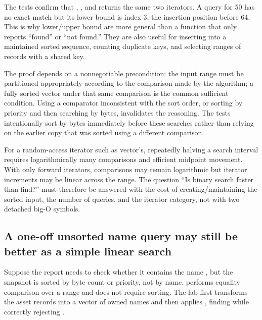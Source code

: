 The tests confirm that , , and  returns the same two iterators. A query for 50 has no exact match but its lower bound is index 3, the insertion position before 64. This is why lower/upper bound are more general than a function that only reports ``found'' or ``not found.'' They are also useful for inserting into a maintained sorted sequence, counting duplicate keys, and selecting ranges of records with a shared key.

The proof depends on a nonnegotiable precondition: the input range must be partitioned appropriately according to the comparison made by the algorithm; a fully sorted vector under that same comparison is the common sufficient condition. Using a comparator inconsistent with the sort order, or sorting by priority and then searching by bytes, invalidates the reasoning. The tests intentionally sort by bytes immediately before these searches rather than relying on the earlier copy that was sorted using a different comparison.

For a random-access iterator such as vector's, repeatedly halving a search interval requires logarithmically many comparisons and efficient midpoint movement. With only forward iterators, comparisons may remain logarithmic but iterator increments may be linear across the range. The question ``Is binary search faster than find?'' must therefore be answered with the cost of creating/maintaining the sorted input, the number of queries, and the iterator category, not with two detached big-O symbols.

\subsection{A one-off unsorted name query may still be better as a simple linear search}\label{01-foundations-i-ch006-a-one-off-unsorted-name-query-may-still-be-better-as-a-simple-linear-search}

\hypertarget{01-foundations-i-ch006-a-one-off-unsorted-name-query-may-still-be-better-as-a-simple-linear-search}{}

Suppose the report needs to check whether it contains the name , but the snapshot is sorted by byte count or priority, not by name.  performs equality comparison over a range and does not require sorting. The lab first transforms the asset records into a vector of owned names and then applies , finding  while correctly rejecting .

